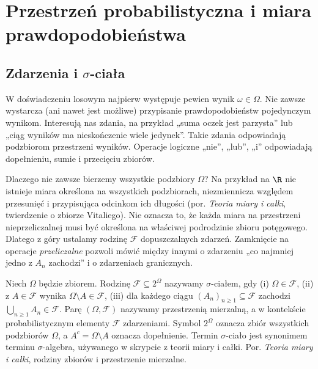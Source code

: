 \chapter{Przestrzeń probabilistyczna i miara prawdopodobieństwa}
\label{ch:probability}

\providecommand{\atlasref}[2]{#2}


\section{Zdarzenia i \texorpdfstring{$\sigma$}{sigma}-ciała}
W doświadczeniu losowym najpierw występuje pewien wynik
$\omega\in\Omega$. Nie zawsze wystarcza (ani nawet jest możliwe) przypisanie
prawdopodobieństw pojedynczym wynikom. Interesują nas zdania,
na przykład „suma oczek jest parzysta” lub „ciąg wyników ma
nieskończenie wiele jedynek”. Takie zdania odpowiadają podzbiorom
przestrzeni wyników. Operacje logiczne „nie”, „lub”, „i” odpowiadają
dopełnieniu, sumie i przecięciu zbiorów.

Dlaczego nie zawsze bierzemy wszystkie podzbiory $\Omega$?
Na przykład na $\R$ nie istnieje miara określona na wszystkich
podzbiorach, niezmiennicza względem przesunięć i przypisująca
odcinkom ich długości (por. \emph{Teoria miary i całki},
\atlasref{ME-04::thm:vitali}{twierdzenie o zbiorze Vitaliego}).
Nie oznacza to, że każda miara na przestrzeni nieprzeliczalnej
musi być określona na właściwej podrodzinie zbioru potęgowego. Dlatego z góry
ustalamy rodzinę $\mathcal F$ dopuszczalnych zdarzeń.
Zamknięcie na operacje \emph{przeliczalne} pozwoli mówić
między innymi o zdarzeniu „co najmniej jedno z $A_n$ zachodzi”
i o zdarzeniach granicznych.

\begin{definicja}
Niech $\Omega$ będzie zbiorem. Rodzinę $\mathcal F\subseteq2^\Omega$
nazywamy $\sigma$-ciałem, gdy (i) $\Omega\in\mathcal F$,
(ii) z $A\in\mathcal F$ wynika $\Omega\setminus A\in\mathcal F$,
(iii) dla każdego ciągu $(A_n)_{n\geq1}\subseteq\mathcal F$ zachodzi
$\bigcup_{n\geq1}A_n\in\mathcal F$.
Parę $(\Omega,\mathcal F)$ nazywamy przestrzenią mierzalną,
a w kontekście probabilistycznym elementy $\mathcal F$ zdarzeniami.
Symbol $2^\Omega$ oznacza zbiór wszystkich podzbiorów $\Omega$,
a $A^c=\Omega\setminus A$ oznacza dopełnienie.
Termin $\sigma$-ciało jest synonimem terminu $\sigma$-algebra,
używanego w skrypcie z teorii miary i całki.
Por. \emph{Teoria miary i całki},
\atlasref{ME-01::ch:przestrzenie-mierzalne}{rodziny zbiorów i przestrzenie mierzalne}.
\end{definicja}

